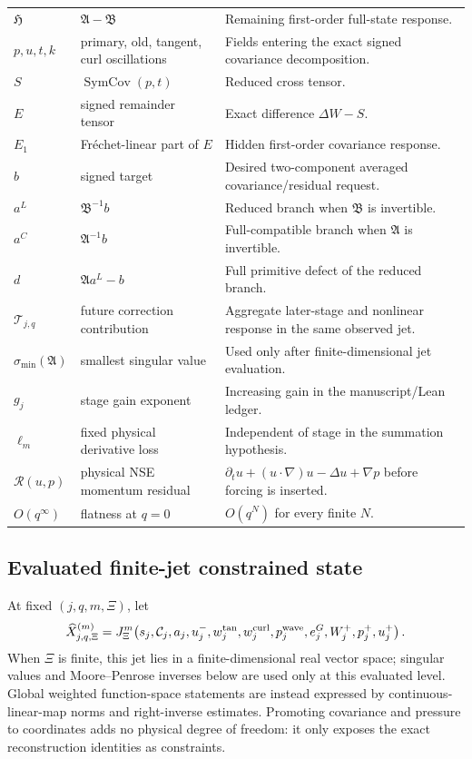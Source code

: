 \documentclass[12pt]{article}
\renewcommand{\arraystretch}{1.10}
\theoremstyle{plain}
\theoremstyle{definition}
\theoremstyle{remark}
\newcommand{\Rres}{\mathcal R}
\newcommand{\SymCov}{\operatorname{SymCov}}
\newcommand{\Flat}{O(q^{\infty})}
\newcommand{\Comp}{\mathfrak A}
\newcommand{\Red}{\mathfrak B}
\newcommand{\Hidden}{\mathfrak H}
\newcommand{\Tail}{\mathscr T}
\begin{document}
\begin{longtable}{>{\raggedright\arraybackslash}p{}>{\raggedright\arraybackslash}p{}>{\raggedright\arraybackslash}p{}}
\(\Hidden\) & \(\Comp-\Red\) & Remaining first-order full-state response. \\
\(p,u,t,k\) & primary, old, tangent, curl oscillations & Fields entering the exact signed covariance decomposition. \\
\(S\) & \(\SymCov(p,t)\) & Reduced cross tensor. \\
\(E\) & signed remainder tensor & Exact difference \(\Delta W-S\). \\
\(E_1\) & Fr\'echet-linear part of \(E\) & Hidden first-order covariance response. \\
\(b\) & signed target & Desired two-component averaged covariance/residual request. \\
\(a^L\) & \(\Red^{-1}b\) & Reduced branch when \(\Red\) is invertible. \\
\(a^C\) & \(\Comp^{-1}b\) & Full-compatible branch when \(\Comp\) is invertible. \\
\(d\) & \(\Comp a^L-b\) & Full primitive defect of the reduced branch. \\
\(\Tail_{j,q}\) & future correction contribution & Aggregate later-stage and nonlinear response in the same observed jet. \\
\(\sigma_{\min}(\Comp)\) & smallest singular value & Used only after finite-dimensional jet evaluation. \\
\(g_j\) & stage gain exponent & Increasing gain in the manuscript/Lean ledger. \\
\(\ell_m\) & fixed physical derivative loss & Independent of stage in the summation hypothesis. \\
\(\Rres(u,p)\) & physical NSE momentum residual & \(\partial_tu+(u\cdot\nabla)u-\Delta u+\nabla p\) before forcing is inserted. \\
\(\Flat\) & flatness at \(q=0\) & \(O(q^N)\) for every finite \(N\). \\
\bottomrule
\end{longtable}
\renewcommand{\arraystretch}{1}

\subsection{Evaluated finite-jet constrained state}
At fixed \((j,q,m,\Xi)\), let
\[
\widehat X_{j,q,\Xi}^{(m)}
=J^m_{\Xi}\!\left(
 s_j,\mathcal C_j,a_j,u_j^{-},w_j^{\rm tan},w_j^{\rm curl},
 p_j^{\rm wave},e_j^G,W_j^{+},p_j^{+},u_j^{+}
\right).
\]
When \(\Xi\) is finite, this jet lies in a finite-dimensional real vector space; singular values and Moore--Penrose inverses below are used only at this evaluated level. Global weighted function-space statements are instead expressed by continuous-linear-map norms and right-inverse estimates. Promoting covariance and pressure to coordinates adds no physical degree of freedom: it only exposes the exact reconstruction identities as constraints.
\end{document}
